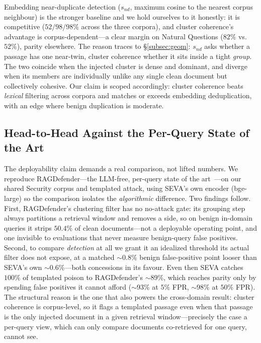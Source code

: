 \documentclass[10pt,journal,compsoc]{IEEEtran}
\begin{document}
Embedding near-duplicate detection ($s_{nd}$, maximum cosine to the nearest corpus neighbour) is
the stronger baseline and we hold ourselves to it honestly: it is competitive ($52/98/98\%$
across the three corpora), and cluster coherence's advantage is corpus-dependent---a clear
margin on Natural Questions ($82\%$ vs.\ $52\%$), parity elsewhere. The reason traces to
\S\ref{subsec:geom}: $s_{nd}$ asks whether a passage has one near-twin, cluster coherence
whether it sits inside a tight \emph{group}. The two coincide when the injected cluster is dense
and dominant, and diverge when its members are individually unlike any single clean document but
collectively cohesive. Our claim is scoped accordingly: cluster coherence beats \emph{lexical}
filtering across corpora and matches or exceeds embedding deduplication, with an edge where
benign duplication is moderate.

\subsection{Head-to-Head Against the Per-Query State of the Art}
\label{subsec:h2h}
The deployability claim demands a real comparison, not lifted numbers. We reproduce
RAGDefender---the LLM-free, per-query state of the art~\cite{ragdefender}---on our shared
Security corpus and templated attack, using SEVA's own encoder (bge-large) so the comparison
isolates the \emph{algorithmic} difference. Two findings follow. First,
RAGDefender's clustering filter has no no-attack gate: its grouping step always partitions a
retrieval window and removes a side, so on benign in-domain queries it strips $50.4\%$ of clean
documents---not a deployable operating point, and one invisible to evaluations that never
measure benign-query false positives. Second, to compare \emph{detection} at all we grant it an
idealized threshold its actual filter does not expose, at a matched $\sim$0.8\% benign
false-positive point looser than SEVA's own $\sim$0.6\%---both concessions in its favour. Even
then SEVA catches $100\%$ of templated poison to RAGDefender's $\sim$89\%, which reaches parity
only by spending false positives it cannot afford ($\sim$93\% at $5\%$ FPR, $\sim$98\% at
$50\%$ FPR).
The structural reason is the one that also powers the cross-domain result: cluster
coherence is corpus-level, so it flags a templated passage even when that passage
is the only injected document in a given retrieval window---precisely the case a
per-query view, which can only compare documents co-retrieved for one query, cannot
see.
\end{document}
